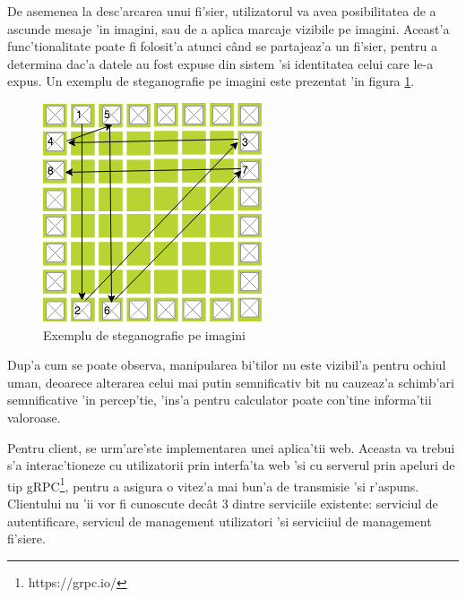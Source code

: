\documentclass[12pt,a4paper,twoside]{report}
\begin{document}
De asemenea la desc'arcarea unui fi'sier, utilizatorul va avea posibilitatea de a ascunde mesaje 'in imagini, sau de a aplica marcaje vizibile pe imagini. Aceast'a func'tionalitate poate fi folosit'a atunci când se partajeaz'a un fi'sier, pentru a determina dac'a datele au fost expuse din sistem 'si identitatea celui care le-a expus. Un exemplu de steganografie pe imagini este prezentat 'in figura \ref{stegano_example}. 
\begin{figure}[H]
\begin{center}
\advance\leftskip-3cm
\advance\rightskip-3cm
\includegraphics[keepaspectratio=true,scale=0.4]{img/stegano_example.png}
\caption{Exemplu de steganografie pe imagini}
\label{stegano_example}
\end{center}
\end{figure}
Dup'a cum se poate observa, manipularea bi'tilor nu este vizibil'a pentru ochiul uman,  deoarece alterarea celui mai putin semnificativ bit nu cauzeaz'a schimb'ari semnificative 'in percep'tie, 'ins'a pentru calculator poate con'tine informa'tii valoroase.

Pentru client, se urm'are'ste implementarea unei aplica'tii web. Aceasta va trebui s'a interac'tioneze cu utilizatorii prin interfa'ta web 'si cu serverul prin apeluri de tip gRPC\footnote{https://grpc.io/}, pentru a asigura o vitez'a mai bun'a de transmisie 'si r'aspuns. Clientului nu 'ii vor fi cunoscute decât 3 dintre serviciile existente: serviciul de autentificare, servicul de management utilizatori 'si  serviciiul de management fi'siere.
\end{document}

